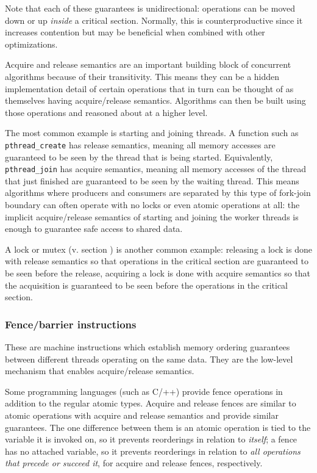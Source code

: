 Note that each of these guarantees is unidirectional: operations can be moved
down or up \emph{inside} a critical section.  Normally, this is
counterproductive since it increases contention but may be beneficial when
combined with other optimizations.

Acquire and release semantics are an important building block of concurrent
algorithms because of their transitivity.  This means they can be a hidden
implementation detail of certain operations that in turn can be thought of as
themselves having acquire/release semantics.  Algorithms can then be built using
those operations and reasoned about at a higher level.

The most common example is starting and joining threads.  A function such as
\texttt{pthread\-\_create} has release semantics, meaning all memory accesses
are guaranteed to be seen by the thread that is being started.  Equivalently,
\texttt{pthread\_join} has acquire semantics, meaning all memory accesses of the
thread that just finished are guaranteed to be seen by the waiting thread.  This
means algorithms where producers and consumers are separated by this type of
fork-join boundary can often operate with no locks or even atomic operations at
all: the implicit acquire/release semantics of starting and joining the worker
threads is enough to guarantee safe access to shared data.

A lock or mutex (v. section ) is another common
example: releasing a lock is done with release semantics so that operations in
the critical section are guaranteed to be seen before the release, acquiring a
lock is done with acquire semantics so that the acquisition is guaranteed to be
seen before the operations in the critical section.

\subsubsection{Fence/barrier instructions}

These are machine instructions which establish memory ordering guarantees
between different threads operating on the same data.  They are the low-level
mechanism that enables acquire/release semantics.

Some programming languages (such as C/++) provide fence operations in addition
to the regular atomic types.  Acquire and release fences are similar to atomic
operations with acquire and release semantics and provide similar guarantees.
The one difference between them is an atomic operation is tied to the variable
it is invoked on, so it prevents reorderings in relation to \emph{itself}; a
fence has no attached variable, so it prevents reorderings in relation to
\emph{all operations that precede or succeed it}, for acquire and release
fences, respectively.

